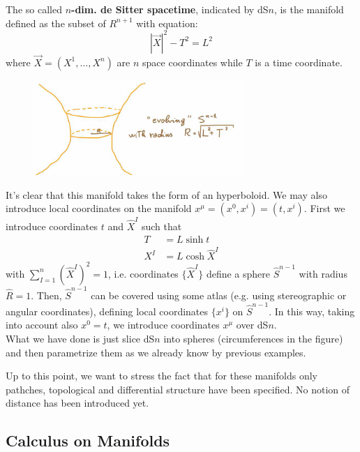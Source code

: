 \documentclass[../main/main.tex]{subfiles}
\begin{document}
\begin{example}
The so called \textbf{$n$-dim. de Sitter spacetime}, indicated by dS$n$, is the manifold defined as the subset of  $R^{n+1}$ with equation:
\[|\vec X|^2-T^2=L^2\]
where $\vec X=(X^1,\dots,X^n)$ are $n$ space coordinates while $T$ is a time coordinate. 
\begin{figure}[H]
\centering
\includegraphics[width=8cm]{../img/de-Sitter-manifold.jpg}
\end{figure}
\noindent It's clear that this manifold takes the form of an hyperboloid. 
We may also introduce local coordinates on the manifold $x^\mu=(x^0,x^i)=(t,x^i)$. First we introduce coordinates $t$ and $\hat X^I$ such that
\begin{align*}
T&=L\sinh t\\
X^I&=L\cosh \hat X^I
\end{align*}
with $\sum_{I=1}^n(\hat X^I)^2=1$, i.e. coordinates $\{\hat X^I\}$ define a sphere $\hat S^{n-1}$ with radius $\hat R=1$. Then, $\hat S^{n-1}$ can be covered using some atlas (e.g. using stereographic or angular coordinates), defining local coordinates $\{x^i\}$ on $\hat S^{n-1}$. In this way, taking into account also $x^0=t$, we introduce coordinates $x^\mu$ over dS$n$. \\
What we have done is just slice dS$n$ into spheres (circumferences in the figure) and then parametrize them as we already know by previous examples. 

\end{example}

Up to this point, we want to stress the fact that for these manifolds only pathches, topological and differential structure have been specified. No notion of distance has been introduced yet. 


\subsection{Calculus on Manifolds}
\end{document}
